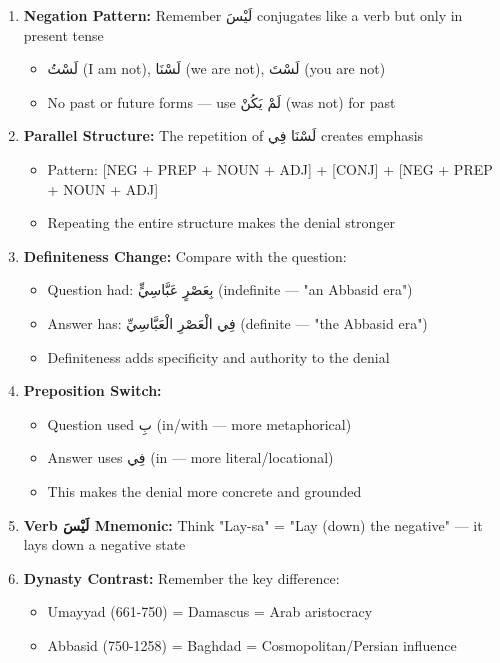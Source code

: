 \documentclass[letterpaper,12pt]{article}
\begin{document}
\begin{enumerate}
\item \textbf{Negation Pattern:} Remember \textarabic{لَيْسَ} conjugates like a verb but only in present tense
  \begin{itemize}
    \item \textarabic{لَسْتُ} (I am not), \textarabic{لَسْنَا} (we are not), \textarabic{لَسْتَ} (you are not)
    \item No past or future forms — use \textarabic{لَمْ يَكُنْ} (was not) for past
  \end{itemize}

\item \textbf{Parallel Structure:} The repetition of \textarabic{لَسْنَا فِي} creates emphasis
  \begin{itemize}
    \item Pattern: [NEG + PREP + NOUN + ADJ] + [CONJ] + [NEG + PREP + NOUN + ADJ]
    \item Repeating the entire structure makes the denial stronger
  \end{itemize}

\item \textbf{Definiteness Change:} Compare with the question:
  \begin{itemize}
    \item Question had: \textarabic{بِعَصْرٍ عَبَّاسِيٍّ} (indefinite — "an Abbasid era")
    \item Answer has: \textarabic{فِي الْعَصْرِ الْعَبَّاسِيِّ} (definite — "the Abbasid era")
    \item Definiteness adds specificity and authority to the denial
  \end{itemize}

\item \textbf{Preposition Switch:}
  \begin{itemize}
    \item Question used \textarabic{بِ} (in/with — more metaphorical)
    \item Answer uses \textarabic{فِي} (in — more literal/locational)
    \item This makes the denial more concrete and grounded
  \end{itemize}

\item \textbf{Verb \textarabic{لَيْسَ} Mnemonic:} Think "Lay-sa" = "Lay (down) the negative" — it lays down a negative state

\item \textbf{Dynasty Contrast:} Remember the key difference:
  \begin{itemize}
    \item Umayyad (661-750) = Damascus = Arab aristocracy
    \item Abbasid (750-1258) = Baghdad = Cosmopolitan/Persian influence
  \end{itemize}
\end{enumerate}
\end{document}

